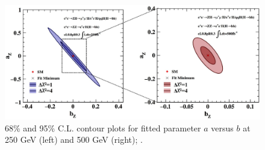 \begin{figure}
\begin{center}
\includegraphics[width=0.85\hsize]{chapters/figures/ZH_anomHVV_ab.eps}
\end{center}
  \caption{68\% and 95\% C.L. contour plots for fitted parameter $a$ versus $b$ at 250 GeV (left)
  and 500 GeV (right);
  \cite{anomHVV}.}
  \label{fig:ZHanomHVV2}
\end{figure}
